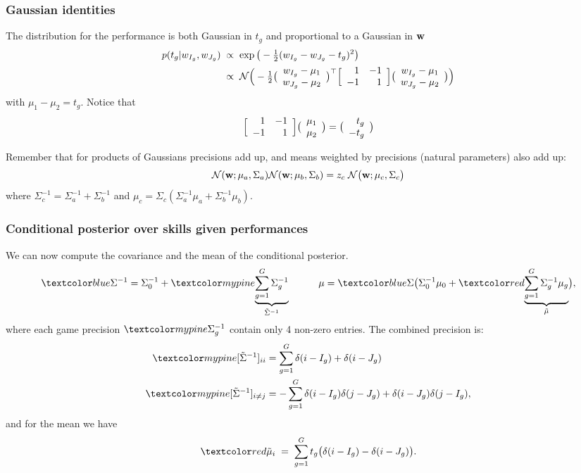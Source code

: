\begin{frame}
\frametitle{Gaussian identities}

The distribution for the performance is both Gaussian in $t_g$ and
proportional to a Gaussian in $\mathbf w$
\[
\begin{split}
p(t_g|w_{I_g}, w_{J_g})\;&\propto\;\exp\big(-\tfrac{1}{2}(w_{I_g}- w_{J_g}-t_g)^2\big)\\
&\propto\;\mathcal{N}\Big(-\tfrac{1}{2}
\big(\begin{array}{c}
w_{I_g}-\mu_1\\
w_{J_g}-\mu_2
\end{array}\big)^\top
\Big[\begin{array}{r r}
1 & -1\\
-1 & 1
\end{array}\Big]
\big(\begin{array}{c}
w_{I_g}-\mu_1\\
w_{J_g}-\mu_2
\end{array}\big)
\Big)
\end{split}
\]
with $\mu_1 - \mu_2 = t_g$. Notice that
\[
\Big[\begin{array}{r r}
1 & -1\\
-1 & 1
\end{array}\Big]
\big(\begin{array}{c}
\mu_1\\
\mu_2
\end{array}\big)
=
\big(\begin{array}{r}
t_g\\
-t_g
\end{array}\big)
\]

Remember that for products of Gaussians precisions add up, and means
 weighted by precisions (natural parameters) also add up:
\[
\mathcal{N}(\mathbf w; \mu_a, \Sigma_a)\mathcal{N}(\mathbf w; \mu_b, \Sigma_b) = z_c \;
\mathcal{N}\big(\mathbf w; \mu_c,
\Sigma_c \big)
\]
where $\Sigma_c^{-1} = \Sigma_a^{-1}+\Sigma_b^{-1}$ and $\mu_c = \Sigma_c (\Sigma_a^{-1}\mu_a+\Sigma_b^{-1}\mu_b)$.
\end{frame}


\begin{frame}
\frametitle{Conditional posterior over skills given performances}

We can now compute the covariance and the mean of the conditional posterior.
\[
\Blue{\Sigma^{-1}} = \Sigma_0^{-1} + 
\Green{\underbrace{\sum_{g=1}^G \Sigma_g^{-1}}_{\tilde\Sigma^{-1}}} 
\;\;\;\;\;\;\;\;\;\;\;
\mu = \Blue{\Sigma}\big(\Sigma_0^{-1}\mu_0 + 
\Red{\underbrace{\sum_{g=1}^G\Sigma_g^{-1}\mu_g}_{\tilde\mu}}\big),
\]
where each game precision $\Green{\Sigma_g^{-1}}$ contain only 4
non-zero entries. The combined precision is:
\[
\begin{split}
\Green{[\tilde\Sigma^{-1}]_{ii}} 
&= \sum_{g=1}^G \delta(i-I_g)+\delta(i-J_g)\\
\Green{[\tilde\Sigma^{-1}]_{i\neq j}} 
&= - \sum_{g=1}^G \delta(i-I_g)\delta(j-J_g) + \delta(i-J_g)\delta(j-I_g),  
\end{split}
\]
and for the mean we have
\[
\Red{\tilde\mu_i}\;=\;\sum_{g=1}^G t_g\big(\delta(i-I_g)-\delta(i-J_g)\big).
\]
\end{frame}

